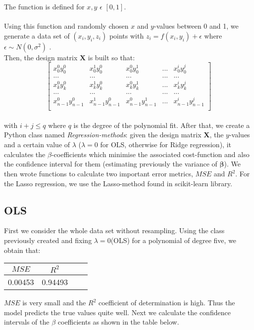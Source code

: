 \documentclass{emulateapj}
\begin{document}
The function is defined for $x,y$ $\epsilon$ $[0, 1]$.
\\
\\Using this function and randomly chosen $x$ and $y$-values between 0 and 1, we generate a data set of $(x_i,y_i,z_i)$ points with $z_i=f(x_i,y_i)+\epsilon$ where $\epsilon \sim N(0,\sigma^2)$  .\\
Then, the design matrix $\textbf{X}$ is built so that:\\
\begin{equation}
\begin{bmatrix}
x_0^{0}y_0^{0} & x_0^{1}y_0^{0} & x_0^{0}y_0^{1} & ... & x_0^{i}y_0^{j}\\
... & ... & ... & ... & ... \\
x_k^{0}y_k^{0} & x_k^{1}y_k^{0} & x_k^{0}y_k^{1} &  ... & x_k^{i}y_k^{j}\\
... & ... & ... & ... & ... \\
x_{n-1}^{0}y_{n-1}^{0} & x_{n-1}^{1}y_{n-1}^{0} & x_{n-1}^{0}y_{n-1}^{1} &  ... & x_{n-1}^{i}y_{n-1}^{j}\\ 
\end{bmatrix}
\end{equation}
\\with $i+j \leq q$ where $q$ is the degree of the polynomial fit. After that, we create a Python class named \textit{Regression-methods}: given the design matrix \textbf{X}, the $y$-values and a certain value of $\lambda$ ($\lambda=0$ for OLS, otherwise for Ridge regression),
it calculates the $\beta$-coefficients which minimise the associated cost-function and also the confidence interval for them (estimating previously the variance of $\boldsymbol{\hat{\beta}}$).
We then wrote functions to calculate two important error metrics, $MSE$ and $R^2$.
For the Lasso regression, we use the Lasso-method found
in scikit-learn library.
\subsection{OLS}
First we consider the whole data set without resampling. Using the class previously created and fixing $\lambda=0$(OLS) for a polynomial of degree five, we obtain that: 
\begin{center}
\begin{tabular}{ |c|c|c|c| } 
\hline
$MSE$ & $R^2$ \\
\hline
0.00453 & 0.94493 \\ 
\hline
\end{tabular}
\end{center}
$MSE$ is very small and the $R^2$ coefficient of determination is high. Thus the model predicts the true values quite well. Next we calculate the confidence intervals of the $\beta$ coefficients as shown in the table below.
\end{document}
